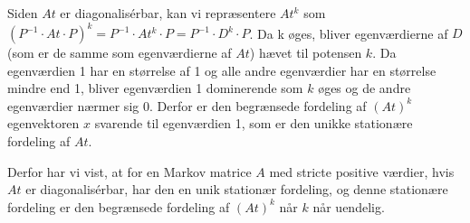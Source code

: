 Siden $At$ er diagonalisérbar, kan vi repræsentere $At^k$ som $(P^{-1} \cdot At \cdot P)^k = P^{-1} \cdot At^k \cdot P = P^{-1} \cdot D^k \cdot P$. Da k øges, bliver egenværdierne af $D$ (som er de samme som egenværdierne af $At$) hævet til potensen $k$. Da egenværdien 1 har en størrelse af 1 og alle andre egenværdier har en størrelse mindre end 1, bliver egenværdien 1 dominerende som $k$ øges og de andre egenværdier nærmer sig 0. Derfor er den begrænsede fordeling af $(At)^k$ egenvektoren $x$ svarende til egenværdien 1, som er den unikke stationære fordeling af $At$.

Derfor har vi vist, at for en Markov matrice $A$ med stricte positive værdier, hvis $At$ er diagonalisérbar, har den en unik stationær fordeling, og denne stationære fordeling er den begrænsede fordeling af $(At)^k$ når $k$ når uendelig.
